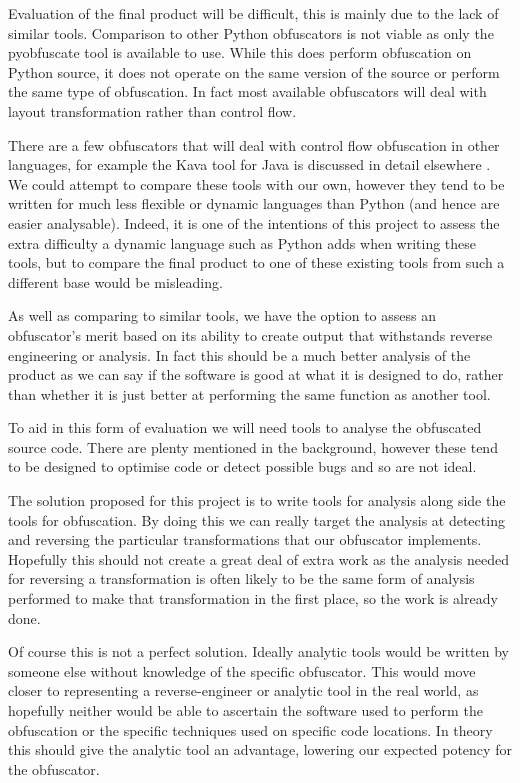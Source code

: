 \documentclass{report}
\begin{document}
Evaluation of the final product will be difficult, this is mainly due to the lack of similar tools.
Comparison to other Python obfuscators is not viable as only the pyobfuscate tool is available to
use. While this does perform obfuscation on Python source, it does not operate on the same version of
the source or perform the same type of obfuscation. In fact most available obfuscators will deal with
layout transformation rather than control flow.

There are a few obfuscators that will deal with control flow obfuscation in other languages, for example
the Kava tool for Java is discussed in detail elsewhere \cite{taxobftrans}. We could attempt to compare these
tools with our own, however they tend to be written for much less flexible or dynamic languages than
Python (and hence are easier analysable). Indeed, it is one of the intentions of this project to assess the
extra difficulty a dynamic language such as Python adds when writing these tools, but to compare the final
product to one of these existing tools from such a different base would be misleading.

As well as comparing to similar tools, we have the option to assess an obfuscator's merit based on
its ability to create output that withstands reverse engineering or analysis. In fact this should be
a much better analysis of the product as we can say if the software is good at what it is designed to do, rather
than whether it is just better at performing the same function as another tool.

To aid in this form of evaluation we will need tools to analyse the obfuscated source code. There are plenty
mentioned in the background, however these tend to be designed to optimise code or detect possible bugs and so
are not ideal.

The solution proposed for this project is to write tools for analysis along side the tools for obfuscation.
By doing this we can really target the analysis at detecting and reversing the particular transformations
that our obfuscator implements. Hopefully this should not create a great deal of extra work as the analysis
needed for reversing a transformation is often likely to be the same form of analysis performed to make that
transformation in the first place, so the work is already done.

Of course this is not a perfect solution. Ideally analytic tools would be written by someone else without
knowledge of the specific obfuscator. This would move closer to representing a reverse-engineer or analytic
tool in the real world, as hopefully neither would be able to ascertain the software used to perform the obfuscation
or the specific techniques used on specific code locations. In theory this should give the analytic tool an
advantage, lowering our expected potency for the obfuscator.
\end{document}
